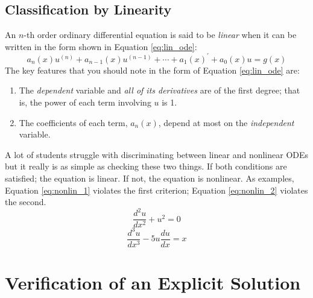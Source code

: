 \subsection{Classification by Linearity}
An $n$-th order ordinary differential equation is said to be \emph{linear} when it can be written in the form shown in Equation \ref{eq:lin_ode}:
\begin{equation}
a_n(x)u^{(n)}+a_{n-1}(x)u^{(n-1)}+\cdots+a_1(x)^{\prime}+a_0(x)u = g(x)
\label{eq:lin_ode}
\end{equation}
The key features that you should note in the form of Equation \ref{eq:lin_ode} are:
\begin{enumerate}
\item The \emph{dependent} variable and \emph{all of its derivatives} are of the first degree; that is, the power of each term involving $u$ is 1.
\item The coefficients of each term, $a_n(x)$, depend at most on the \emph{independent} variable.
\end{enumerate}
A lot of students struggle with discriminating between linear and nonlinear ODEs but it really is as simple as checking these two things.  If both conditions are satisfied; the equation is linear.  If not, the equation is nonlinear.  As examples, Equation \ref{eq:nonlin_1} violates the first criterion; Equation \ref{eq:nonlin_2} violates the second.
\begin{equation}
\frac{d^2u}{dx^2}+u^2 = 0 
\label{eq:nonlin_1}
\end{equation}
\begin{equation}
\frac{d^3u}{dx^3}-5u\frac{du}{dx}=x
\label{eq:nonlin_2}
\end{equation}
\section{Verification of an Explicit Solution} 


